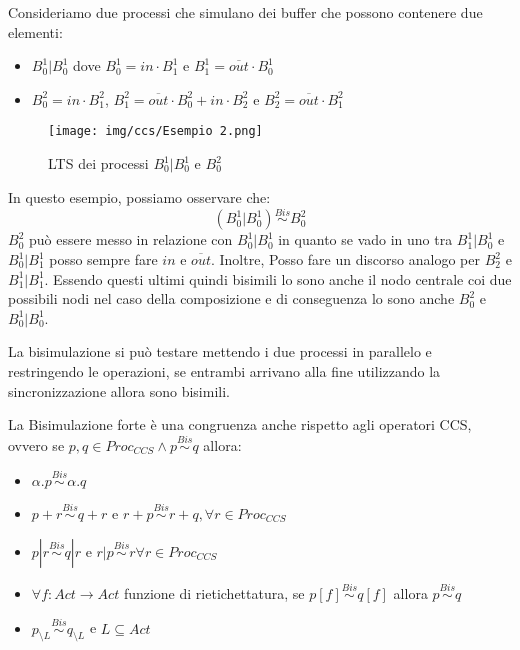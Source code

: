 \begin{esempio}
    Consideriamo due processi che simulano dei buffer che possono contenere due
    elementi:
    \begin{itemize}
        \item $B_0^1 | B_0^1$ dove $B_0^1 = in \cdot B_1^1$ e $B_1^1 =
                  \overline{out} \cdot B_0^1$
        \item $B_0^2 = in \cdot B_1^2$, $B_1^2= \overline{out} \cdot B_0^2 + in
                  \cdot B_2^2$ e $B_2^2 = \overline{out} \cdot B_1^2$
    \end{itemize}
    \begin{figure}[!ht]
        \centering
        \texttt{[image: img/ccs/Esempio 2.png]}
        \caption{LTS dei processi $B_0^1 | B_0^1$ e $B_0^2$}
    \end{figure}
    In questo esempio, possiamo osservare che: $$(B_0^1 | B_0^1) \stackrel{Bis}{\sim} B_0^2$$
    $B_0^2$ può essere messo in relazione con $B_0^1| B_0^1$ in quanto se vado
    in uno tra $B_1^1 | B_0^1$ e $B_0^1 | B_1^1$ posso sempre fare $in$ e $\overline{out}$.
    Inoltre, Posso fare un discorso analogo per $B_2^2$ e $B_1^1 | B_1^1$.
    Essendo questi ultimi quindi bisimili lo sono anche il nodo centrale coi
    due possibili nodi nel caso della composizione e di conseguenza lo sono
    anche $B_0^2$ e $B_0^1 | B_0^1$.
\end{esempio}
La bisimulazione si può testare mettendo i due processi in parallelo e restringendo
le operazioni, se entrambi arrivano alla fine utilizzando la sincronizzazione
allora sono bisimili.
\begin{osservazione}
    La Bisimulazione forte è una congruenza anche rispetto agli operatori CCS,
    ovvero se $p, q \in Proc_{CCS} \land p \stackrel{Bis}{\sim} q$ allora:
    \begin{itemize}
        \item $\alpha.p \stackrel{Bis}{\sim} \alpha.q$
        \item $p + r \stackrel{Bis}{\sim}q + r$ e $r + p \stackrel{Bis}{\sim} r
                  + q, \forall r \in Proc_{CCS}$
        \item $p | r \stackrel{Bis}{\sim} q | r$ e $r | p \stackrel{Bis}{\sim} r
                  \forall r \in Proc_{CCS}$
        \item $\forall f: Act \to Act$ funzione di rietichettatura, se $p[f]
                  \stackrel{Bis}{\sim} q[f]$ allora $p \stackrel{Bis}{\sim} q$
        \item $p_{\setminus L} \stackrel{Bis}{\sim} q_{\setminus L}$ e $L \subseteq
                  Act$
    \end{itemize}
\end{osservazione}
